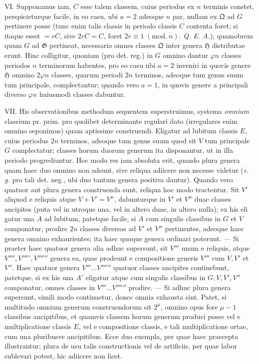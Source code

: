 VI. Supponamus iam, \(C\) esse talem classem, cuius periodus ex \(n\) terminis constet, perspicieturque facile, in eo casu, ubi \(a=2\) adeoque \(n\) par, nullam ex \(\mathfrak Q\) ad \(G\) pertinere posse (tunc enim talis classis in periodo classis \(C\) contenta foret; si itaque esset \(=rC\), sive \(2rC=C\), foret \(2r\equiv1\; (\mathrm{mod}.\ n)\). \textit{Q. E. A.}); quamobrem quum \(G\) ad \(\mathfrak G\) pertineat, necessario omnes classes \(\mathfrak Q\) inter genera \(\mathfrak H\) distributae erunt. Hinc colligitur, quoniam (pro det. reg.) in \(G\) omnino dantur \(\varphi n\) classes periodos \(n\) terminorum habentes, pro eo casu ubi \(a=2\) inveniri in quovis genere \(\mathfrak H\) omnino \(2\varphi n\) classes, quarum periodi \(2n\) terminos, adeoque tum genus suum tum principale, complectantur; quando vero \(a=1\), in quovis genere a principali diverso \(\varphi n\) huiusmodi classes dabuntur.

VII. His observationibus methodum sequentem superstruimus, systema \textit{omnium} classium pr. prim. pro quolibet determinante regulari dato (irregulares enim omnino seponimus) quam aptissime construendi. Eligatur ad lubitum classis \(E\), cuius periodus \(2n\) terminos, adeoque tum genus suum quod sit \(V\) tum principale \(G\) complectatur; classes horum duorum generum ita disponantur, ut in illa periodo progrediuntur. Hoc modo res iam absoluta erit, quando plura genera quam haec duo omnino non adsunt, sive reliqua adiicere non necesse videtur (\textit{e. g.} pro tali det. neg., ubi duo tantum genera positiva dantur). Quando vero quatuor aut plura genera construenda sunt, reliqua hoc modo tractentur. Sit \(V'\) aliquod e reliquis atque \(V+V'=V''\), dabunturque in \(V'\) et \(V''\) duae classes ancipites (puta vel in utroque una, vel in altero duae, in altero nulla); ex his eli%
gatur una \(A\) ad lubitum, patetque facile, si \(A\) cum singulis classibus in \(G\) et \(V\) componatur, prodire \(2n\) classes diversas ad \(V'\) et \(V''\) pertinentes, adeoque haec genera omnino exhaurientes; ita haec quoque genera ordinari poterunt. — Si praeter haec quatuor genera alia adhuc supersunt, sit \(V'''\) unum e reliquis, atque \(V'''',V''''',V''''''\) genera ea, quae prodeunt e compositione generis \(V'''\) cum \(V,V'\) et \(V''\). Haec quatuor genera \(V'''\ldots V''''''\) quatuor classes ancipites continebunt, patetque, si ex his una \(A'\) eligatur atque cum singulis classibus in \(G,V,V',V''\) componatur, omnes classes in \(V'''\ldots V''''''\) prodire. — Si adhuc plura genera supersunt, simili modo continuetur, donec omnia exhausta sint. Patet, si multitudo omnium generum construendorum sit \(2^\mu\), omnino opus fore \(\mu-1\) classibus ancipitibus, et quamvis classem horum generum produci posse vel e multiplicatione classis \(E\), vel e compositione classis, e tali multiplicatione ortae, cum una pluribusve ancipitibus. Ecce duo exempla, per quae haec praecepta illustrantur; plura de usu talis constructionis vel de artificiis, per quae labor sublevari potest, hic adiicere non licet.

